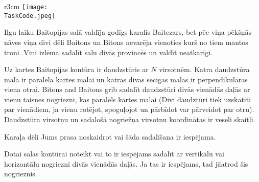 \documentclass{boi2014-lv}
\renewcommand{\TaskCode}{demarcation}
\begin{document}
    \begin{wrapfigure}{r}{3cm}
        \vspace{-24pt}
		\texttt{[image: \\TaskCode.jpeg]}
	\end{wrapfigure}

		Ilgu laiku Baitopijas salā valdīja godīgs karalis Baitezars, bet pēc viņa pēkšņās nāves viņa divi dēli Baitons un Bitons nevarēja vienoties kurš no tiem mantos troni. Viņi izlēma sadalīt salu divās provincēs un valdīt neatkarīgi.
 
		Uz kartes Baitopijas kontūra ir daudzstūris ar $N$ virsotnēm. Katra daudzstūra mala ir paralēla kartes malai un katras divas secīgas malas ir perpendikulāras viena otrai. Bitons and Baitons grib sadalīt daudzstūri divās vienādās daļās ar vienu taisnes nogriezni, kas paralēls kartes malai (Divi daudztūri tiek uzskatīti par vienādiem, ja vienu rotējot, spoguļojot un pārbīdot var pārveidot par otru). Daudzstūra virsotņu un sadalošā nogriežņa virsotņu koordinātas ir veseli skaitļi. 
 
		Karaļa dēli Jums prasa noskaidrot vai šāda sadalīšana ir iespējama.

    \Task
		
		Dotai salas kontūrai noteikt vai to ir iespējams sadalīt ar vertikālu vai horizontālu nogriezni divās vienādās daļās. Ja tas ir iespējams, tad jāatrod šis nogrieznis.
\end{document}
